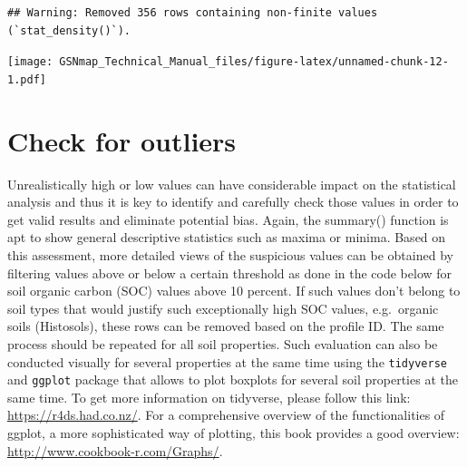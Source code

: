 \documentclass[
  10pt,
  b5paper,
  oneside]{book}
\newenvironment{Shaded}{\begin{snugshade}}{\end{snugshade}}
\newcommand{\CommentTok}[1]{\textcolor[rgb]{0.56,0.35,0.01}{\textit{#1}}}
\newcommand{\DocumentationTok}[1]{\textcolor[rgb]{0.56,0.35,0.01}{\textbf{\textit{#1}}}}
\newcommand{\FunctionTok}[1]{\textcolor[rgb]{0.00,0.00,0.00}{#1}}
\newcommand{\NormalTok}[1]{#1}
\newcommand{\SpecialCharTok}[1]{\textcolor[rgb]{0.00,0.00,0.00}{#1}}
\begin{document}
\begin{verbatim}
## Warning: Removed 356 rows containing non-finite values (`stat_density()`).
\end{verbatim}

\texttt{[image: GSNmap\_Technical\_Manual\_files/figure-latex/unnamed-chunk-12-1.pdf]}

\hypertarget{check-for-outliers}{%
\section{Check for outliers}\label{check-for-outliers}}

Unrealistically high or low values can have considerable impact on the statistical analysis and thus it is key to identify and carefully check those values in order to get valid results and eliminate potential bias. Again, the summary() function is apt to show general descriptive statistics such as maxima or minima. Based on this assessment, more detailed views of the suspicious values can be obtained by filtering values above or below a certain threshold as done in the code below for soil organic carbon (SOC) values above 10 percent. If such values don't belong to soil types that would justify such exceptionally high SOC values, e.g.~organic soils (Histosols), these rows can be removed based on the profile ID. The same process should be repeated for all soil properties.
Such evaluation can also be conducted visually for several properties at the same time using the \texttt{tidyverse} and \texttt{ggplot} package that allows to plot boxplots for several soil properties at the same time. To get more information on tidyverse, please follow this link: \url{https://r4ds.had.co.nz/}. For a comprehensive overview of the functionalities of ggplot, a more sophisticated way of plotting, this book provides a good overview: \url{http://www.cookbook-r.com/Graphs/}.

\begin{Shaded}
\end{Shaded}
\end{document}
